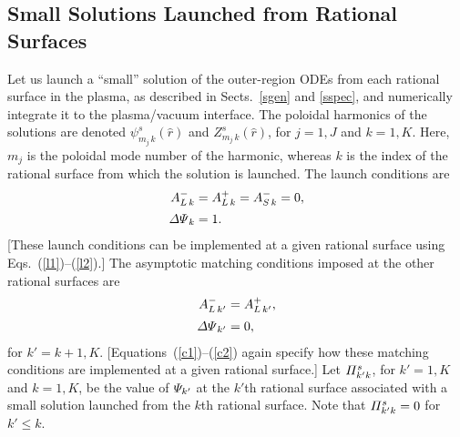 \documentclass[12pt,prb,aps]{revtex4-1}
\begin{document}
\subsection{Small Solutions Launched from Rational Surfaces}\label{smalll}
Let us launch a ``small'' solution of the outer-region ODEs  from each rational surface in the plasma, as described in Sects.~\ref{sgen} and \ref{sspec}, 
 and numerically integrate it to the plasma/vacuum interface. The poloidal harmonics of
the solutions are denoted $\psi^s_{m_{j}\,k}(\hat{r})$ and $Z^s_{m_{j}\,k}(\hat{r})$, for $j=1,J$ and $k=1,K$. Here,
$m_{j}$ is the poloidal mode number of the harmonic, whereas $k$ is the index of the rational surface from which the solution is launched.
The launch conditions are
\begin{align}
A_{L\,k}^- &= A_{L\,k}^+ = A_{S\,k}^- = 0,\\[0.5ex]
{\mit\Delta\Psi}_k &=1.
\end{align}
[These launch conditions can be implemented at a given rational surface using Eqs.~(\ref{l1})--(\ref{l2}).]
The asymptotic matching conditions imposed at the other rational surfaces are
\begin{align}
A_{L\,k'}^{-} &= A_{L\,k'}^+,\\[0.5ex]
{\mit\Delta\Psi}_{k'} &= 0,
\end{align}
for $k'=k+1,K$. [Equations~(\ref{c1})--(\ref{c2}) again specify how these matching conditions are implemented at a given rational surface.]
Let 
${\mit\Pi}_{k'k}^s$, for $k'=1,K$ and $k=1,K$,  be the value of ${\mit\Psi}_{k'}$ at the $k'$th rational surface associated with a small solution
launched from the $k$th rational surface. Note that ${\mit\Pi}_{k'k}^s=0$ for $k' \leq k$.  
\end{document}
